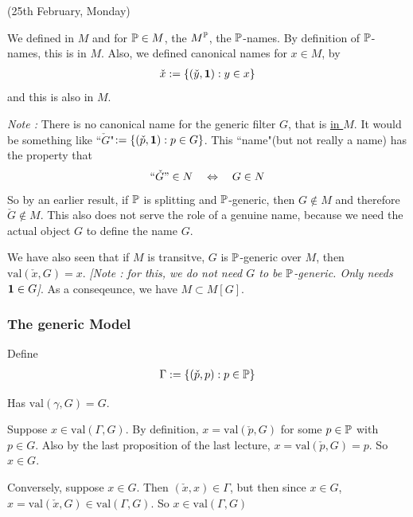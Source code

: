 \documentclass[12pt,a4paper]{article}
\newenvironment{proof}
{\begin{changemargin}{0.5cm}{0.5cm} 
	}%
	{\end{changemargin}
}
\newenvironment{p}
{\begin{proof} 
	}%
	{\end{proof}
}
\begin{document}
\newday

(25th February, Monday)
\s

We defined in $M$ and for $\mathbb{P} \in M$, the $M^{\mathbb{P}}$, the $\mathbb{P}$-names. By definition of $\mathbb{P}$-names, this is in $M$. Also, we defined canonical names for $x\in M$, by
\begin{align*}
\check{x} := \{(\check{y}, \bm{1}): y\in x\}
\end{align*}
and this is also in $M$.
\s

\emph{Note :} There is no canonical name for the generic filter $G$, that is \underline{in $M$}. It would be something like ``$\check{G}$"$:= \{(\check{p}, \bm{1}) : p\in G\}$. This ``name"(but not really a name) has the property that
\begin{align*}
``\check{G}" \in N \quad \Leftrightarrow \quad G\in N
\end{align*}
So by an earlier result, if $\mathbb{P}$ is splitting and $\mathbb{P}$-generic, then $G\not\in M$ and therefore $\check{G} \not\in M$. This also does not serve the role of a genuine name, because we need the actual object $G$ to define the name $G$.
\s

We have also seen that if $M$ is transitve, $G$ is $\mathbb{P}$-generic over $M$, then $\text{val}(\check{x}, G) = x$. \emph{[Note : for this, we do not need $G$ to be $\mathbb{P}$-generic. Only needs $\bm{1}\in G$]}. As a conseqeunce, we have $M\subset M[G]$.
\s

\subsubsection*{The generic Model}

 Define
\begin{align*}
\Gamma := \{(\check{p}, p) : p\in \mathbb{P} \}
\end{align*}

\lem Has $\text{val}(\gamma, G) = G$.
\begin{p}
\pf Suppose $x\in \text{val}(\Gamma, G)$. By definition, $x= \text{val}(\check{p}, G)$ for some $p\in \mathbb{P}$ with $p\in G$. Also by the last proposition of the last lecture, $x= \text{val}(\check{p}, G) =p$. So $x\in G$.

\quad Conversely, suppose $x\in G$. Then $(\check{x}, x)\in \Gamma$, but then since $x\in G$, $x= \text{val}(\check{x}, G)\in \text{val}(\Gamma, G)$. So $x\in \text{val}(\Gamma, G)$

\eop
\end{p}
\s
\end{document}
